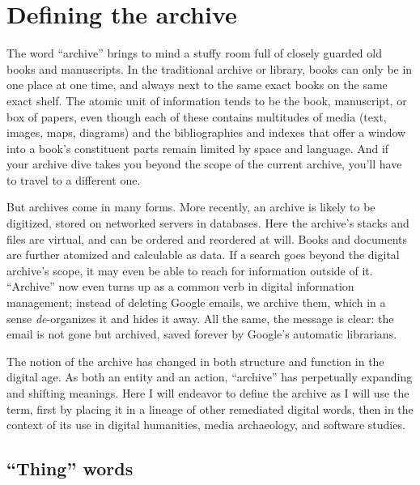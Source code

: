 \section{Defining the archive}

The word ``archive'' brings to mind a stuffy room full of closely guarded old books and manuscripts. In the traditional archive or library, books can only be in one place at one time, and always next to the same exact books on the same exact shelf. The atomic unit of information tends to be the book, manuscript, or box of papers, even though each of these contains multitudes of media (text, images, maps, diagrams) and the bibliographies and indexes that offer a window into a book's constituent parts remain limited by space and language. And if your archive dive takes you beyond the scope of the current archive, you'll have to travel to a different one.

But archives come in many forms. More recently, an archive is likely to be digitized, stored on networked servers in databases. Here the archive's stacks and files are virtual, and can be ordered and reordered at will. Books and documents are further atomized and calculable as data. If a search goes beyond the digital archive's scope, it may even be able to reach for information outside of it. ``Archive'' now even turns up as a common verb in digital information management; instead of deleting Google emails, we archive them, which in a sense \emph{de}-organizes it and hides it away. All the same, the message is clear: the email is not gone but archived, saved forever by Google's automatic librarians.

The notion of the archive has changed in both structure and function in the digital age. As both an entity and an action, ``archive'' has perpetually expanding and shifting meanings. Here I will endeavor to define the archive as I will use the term, first by placing it in a lineage of other remediated digital words, then in the context of its use in digital humanities, media archaeology, and software studies.

\subsection{``Thing'' words}

